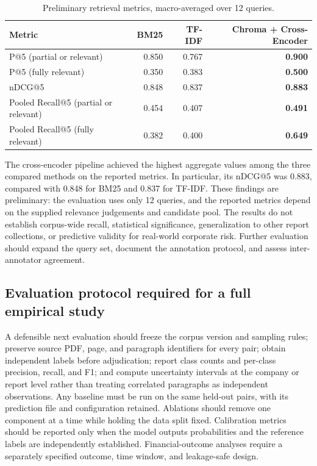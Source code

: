 \documentclass[pdflatex,sn-basic,Numbered]{sn-jnl}
\begin{document}
\begin{table}[htbp]
\centering
\caption{Preliminary retrieval metrics, macro-averaged over 12 queries.}
\label{tab:retrieval-metrics}
\begin{tabular}{lrrr}
\hline
Metric & BM25 & TF-IDF & Chroma + Cross-Encoder \\
\hline
P@5 (partial or relevant) & 0.850 & 0.767 & \textbf{0.900} \\
P@5 (fully relevant) & 0.350 & 0.383 & \textbf{0.500} \\
nDCG@5 & 0.848 & 0.837 & \textbf{0.883} \\
Pooled Recall@5 (partial or relevant) & 0.454 & 0.407 & \textbf{0.491} \\
Pooled Recall@5 (fully relevant) & 0.382 & 0.400 & \textbf{0.649} \\
\hline
\end{tabular}
\end{table}

The cross-encoder pipeline achieved the highest aggregate values among the
three compared methods on the reported metrics. In particular, its nDCG@5
was 0.883, compared with 0.848 for BM25 and 0.837 for TF-IDF. These findings
are preliminary: the evaluation uses only 12 queries, and the reported
metrics depend on the supplied relevance judgements and candidate pool.
The results do not establish corpus-wide recall, statistical significance,
generalization to other report collections, or predictive validity for
real-world corporate risk. Further evaluation should expand the query set,
document the annotation protocol, and assess inter-annotator agreement.

\subsection{Evaluation protocol required for a full empirical study}
A defensible next evaluation should freeze the corpus version and sampling rules; preserve source PDF, page, and paragraph identifiers for every pair; obtain independent labels before adjudication; report class counts and per-class precision, recall, and F1; and compute uncertainty intervals at the company or report level rather than treating correlated paragraphs as independent observations. Any baseline must be run on the same held-out pairs, with its prediction file and configuration retained. Ablations should remove one component at a time while holding the data split fixed. Calibration metrics should be reported only when the model outputs probabilities and the reference labels are independently established. Financial-outcome analyses require a separately specified outcome, time window, and leakage-safe design.
\end{document}
